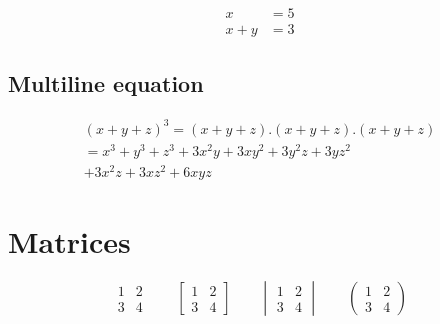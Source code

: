 \documentclass[12pt,a4paper]{article}
\begin{document}
\begin{align}
x &= 5 \\
x+y &= 3
\end{align}

\subsection{Multiline equation}

\begin{multline*}
(x+y+z)^3 = (x+y+z).(x+y+z).(x+y+z) \\
= x^3+y^3+z^3+3x^2y+3xy^2+3y^2z+3yz^2 \\
+3x^2z+3xz^2+6xyz
\end{multline*}

\section{Matrices}

\[
\begin{matrix}
1 & 2 \\
3 & 4
\end{matrix}
\qquad
\begin{bmatrix}
1 & 2 \\
3 & 4
\end{bmatrix}
\qquad
\begin{vmatrix}
1 & 2 \\
3 & 4
\end{vmatrix}
\qquad
\begin{pmatrix}
1 & 2 \\
3 & 4
\end{pmatrix}
\]
\end{document}
